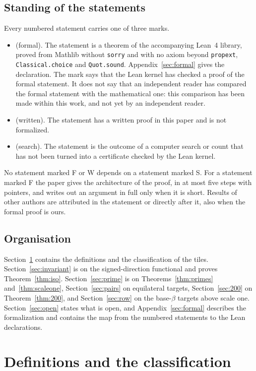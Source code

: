\documentclass[11pt,reqno]{amsart}
\theoremstyle{plain}
\theoremstyle{definition}
\newcommand{\sF}{\textup{\textsf{F}}}
\newcommand{\sW}{\textup{\textsf{W}}}
\newcommand{\sS}{\textup{\textsf{S}}}
\begin{document}
\subsection{Standing of the statements}\label{sub:standing}
Every numbered statement carries one of three marks.
\begin{itemize}
\item[\sF] (formal). The statement is a theorem of the accompanying Lean~4 library, proved from Mathlib
without \texttt{sorry} and with no axiom beyond \texttt{propext}, \texttt{Classical.choice} and
\texttt{Quot.sound}. Appendix~\ref{sec:formal} gives the declaration.
The mark says that the Lean kernel has checked a proof of the formal statement. It does not say that an
independent reader has compared the formal statement with the mathematical one: this comparison has been
made within this work, and not yet by an independent reader.
\item[\sW] (written). The statement has a written proof in this paper and is not formalized.
\item[\sS] (search). The statement is the outcome of a computer search or count that has not been turned
into a certificate checked by the Lean kernel.
\end{itemize}
No statement marked \sF{} or \sW{} depends on a statement marked \sS. For a statement marked \sF{} the
paper gives the architecture of the proof, in at most five steps with pointers, and writes out an argument
in full only when it is short. Results of other authors are attributed in the statement or directly after
it, also when the formal proof is ours.

\subsection{Organisation}
Section~\ref{sec:defs} contains the definitions and the classification of the tiles.
Section~\ref{sec:invariant} is on the signed-direction functional and proves Theorem~\ref{thm:iso}.
Section~\ref{sec:prime} is on Theorems~\ref{thm:primes} and~\ref{thm:scaleone}, Section~\ref{sec:pairs} on
equilateral targets, Section~\ref{sec:200} on Theorem~\ref{thm:200}, and Section~\ref{sec:row} on the
base-$\beta$ targets above scale one. Section~\ref{sec:open} states what is open, and
Appendix~\ref{sec:formal} describes the formalization and contains the map from the numbered statements to
the Lean declarations.

\section{Definitions and the classification}\label{sec:defs}
\end{document}
